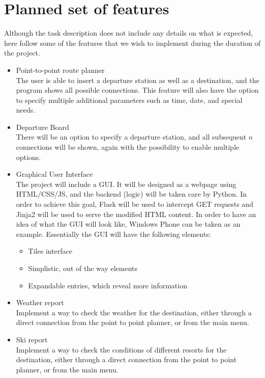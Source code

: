 \documentclass[a4paper]{article}
\def\braces#1{[#1]}
\begin{document}
\section{Planned set of features}
Although the task description does not include any details on what is expected, here follow some of the features that we wish to implement during the duration of the project.
\begin{itemize}
\item Point-to-point route planner\\ The user is able to insert a departure station as well as a destination, and the program shows all possible connections. This feature will also have the option to specify multiple additional parameters such as time, date, and special needs. 
\item Departure Board\\
There will be an option to specify a departure station, and all subsequent $n$ connections will be shown, again with the possibility to enable multiple options. 

\item Graphical User Interface\\
The project will include a GUI. It will be designed as a webpage using HTML/CSS/JS, and the backend (logic) will be taken care by Python. In order to achieve this goal, Flask will be used to intercept GET requests and Jinja2 will be used to serve the modified HTML content.  In order to have an idea of what the GUI will look like, Windows Phone can be taken as an example. Essentially the GUI will have the following elements:
\begin{itemize}
\item Tiles interface
\item Simplistic, out of the way elements
\item Expandable entries, which reveal more information
\end{itemize}


\item \braces{Optional} Weather report\\
Implement a way to check the weather for the destination, either through a direct connection from the point to point planner, or from the main menu. 

\item \braces{Optional} Ski report\\
Implement a way to check the conditions of different resorts for the destination, either through a direct connection from the point to point planner, or from the main menu. 
\end{itemize}
\end{document}

